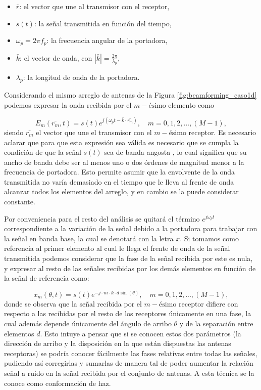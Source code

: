 \begin{itemize}
    \item $\bar{r}$: el vector que une al transmisor con el receptor,
    \item $s(t)$: la señal transmitida en función del tiempo,
    \item $\omega_p=2\pi f_p$: la frecuencia angular de la portadora,
    \item $\bar{k}$: el vector de onda, con $|\bar{k}|=\frac{2\pi}{\lambda_p}$,
    \item ${\lambda_p}$: la longitud de onda de la portadora.
\end{itemize}

Considerando el mismo arreglo de antenas de la Figura \ref{fig:beamforming_caso1d} podemos expresar la onda recibida por el $m-\textrm{ésimo}$ elemento como

\begin{equation}
    E_m(\bar{r_m},t)=s(t)e^{j(\omega_p t - \bar{k}\cdot\bar{r_m})},\quad m=0,1,2,...,(M-1),
\end{equation}
siendo $\bar{r_m}$ el vector que une el transmisor con el $m-\textrm{ésimo}$ receptor.
Es necesario aclarar que para que esta expresión sea válida es necesario que se cumpla la condición de que la señal $s(t)$ sea de banda angosta \cite{bib:2decadesp70}, lo cual significa que su ancho de banda debe ser al menos uno o dos órdenes de magnitud menor a la frecuencia de portadora. Esto permite asumir que la envolvente de la onda transmitida no varía demasiado en el tiempo que le lleva al frente de onda alcanzar todos los elementos del arreglo, y en cambio se la puede considerar constante.

Por conveniencia para el resto del análisis se quitará el término $e^{j\omega_p t}$ correspondiente a la variación de la señal debido a la portadora para trabajar con la señal en banda base, la cual se denotará con la letra $x$. Si tomamos como referencia al primer elemento al cual le llega el frente de onda de la señal transmitida podemos considerar que la fase de la señal recibida por este es nula, y expresar al resto de las señales recibidas por los demás elementos en función de la señal de referencia como:

\begin{equation}
    x_m (\theta,t) =s(t) e^{-j\cdot m \cdot k \cdot d\sin(\theta)},\quad m=0,1,2,...,(M-1),
    \label{eq:beamforming_sample_ula_iso}
\end{equation}
donde se observa que la señal recibida por el $m-\textrm{ésimo}$ receptor difiere con respecto a las recibidas por el resto de los receptores únicamente en una fase, la cual además depende únicamente del ángulo de arribo $\theta$ y de la separación entre elementos $d$. Esto intuye a pensar que si se conocen estos dos parámetros (la dirección de arribo y la disposición en la que están dispuestas las antenas receptoras) se podría conocer fácilmente las fases relativas entre todas las señales, pudiendo así corregirlas y sumarlas de manera tal de poder aumentar la relación señal a ruido en la señal recibida por el conjunto de antenas. A esta técnica se la conoce como conformación de haz.


